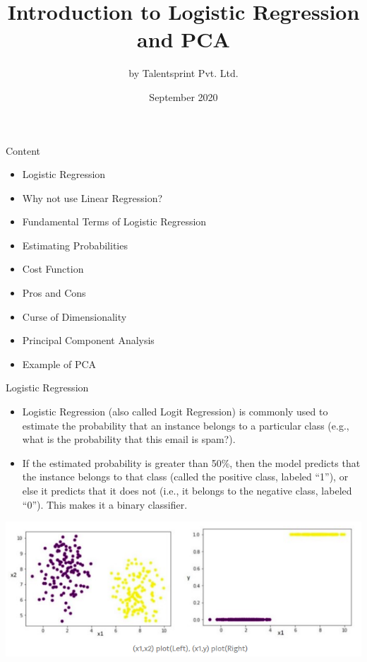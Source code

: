 \documentclass{beamer}
\title{Introduction to Logistic Regression and PCA}
\author{by Talentsprint Pvt. Ltd.}
\date{September 2020}
\begin{document}
\maketitle
\begin{frame}{Content}
	\begin{itemize}
		\item Logistic Regression
		\item Why not use Linear Regression?
		\item Fundamental Terms of Logistic Regression
		\item Estimating Probabilities
		\item Cost Function
		\item Pros and Cons
		\item Curse of Dimensionality
		\item Principal Component Analysis
		\item Example of PCA
	\end{itemize}
\end{frame}

\begin{frame}{Logistic Regression}
\begin{flushleft}
\begin{itemize}
	\item Logistic Regression (also called Logit Regression) is commonly used to estimate the probability that an instance belongs to a particular class (e.g., what is the probability that this email is spam?).
	\item If the estimated probability is greater than 50\%, then the model predicts that the instance belongs to that class (called the positive class, labeled “1”), or else it predicts that it does not (i.e., it belongs to the negative class, labeled “0”). This makes it a binary classifier.
\end{itemize}
\includegraphics[scale=0.5]{Logistic_reg}\\
\end{flushleft}
\end{frame}
\end{document}
